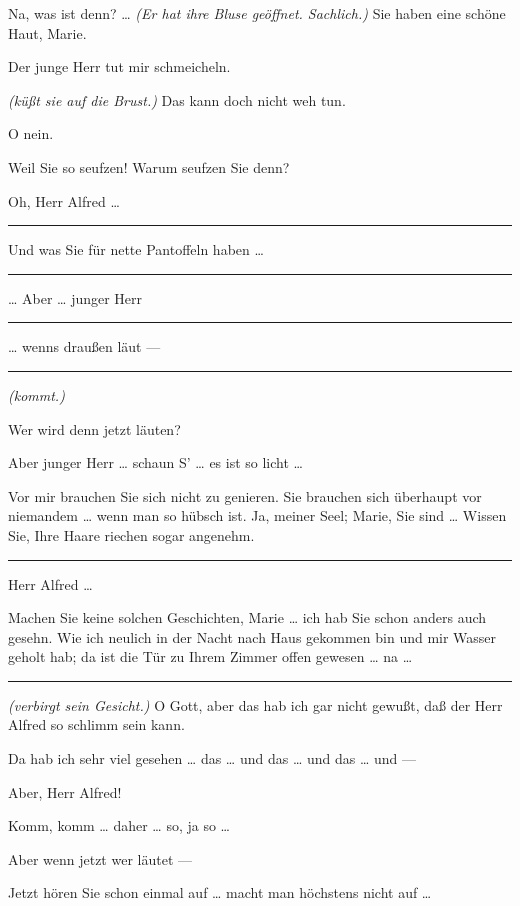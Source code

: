 \documentclass[
	final,
	a4paper,
	ngerman,
	mpinclude = true, %
	twoside = true,
	open = right,
	cleardoublepage = plain,
	DIV = 13,
	BCOR = 1cm,
	titlepage = firstiscover,
	]{scrbook}
\newcommand{\direction}[1]{\textit{(#1)}}
\newenvironment{deletion}{%
		\vspace{0.25\baselineskip}
		\hrule
		\vspace{0.25\baselineskip}
		\color{darkgray}
	}{
		\color{black}
		\vspace{0.25\baselineskip}
		\hrule 
		\vspace{0.25\baselineskip}
	}
\newcommand{\thecharacter}[1]{\textup{\textsc{#1}}\xspace}
\newcommand{\thepraktikant}{\thecharacter{Timo}}
\newcommand{\theherr}{\thecharacter{Benjamin}}
\newcommand{\character}[1]{\item[#1:]}
\newcommand{\praktikant}{\character{\thepraktikant}}
\newcommand{\herr}{\character{\theherr}}
\begin{document}
\begin{play}
	\herr
	Na, was ist denn? \ldots{} \direction{Er hat ihre Bluse geöffnet. Sachlich.} Sie haben eine schöne Haut, Marie.

	\praktikant
	Der junge Herr tut mir schmeicheln.

	\herr
	\direction{küßt sie auf die Brust.} Das kann doch nicht weh tun.

	\praktikant
	O nein.

	\herr
	Weil Sie so seufzen! Warum seufzen Sie denn?

	\praktikant
	Oh, Herr Alfred \ldots{}

	\begin{deletion}
	\herr
	Und was Sie für nette Pantoffeln haben \ldots{}
	\end{deletion}

	\praktikant
	\ldots{} Aber \ldots{} junger Herr 
	\begin{deletion}
		\ldots{} wenns draußen läut ---
	\end{deletion}
	\direction{kommt.}

	\herr
	Wer wird denn jetzt läuten?

	\praktikant
	Aber junger Herr \ldots{} schaun S' \ldots{} es ist so licht \ldots{}

	\herr
	Vor mir brauchen Sie sich nicht zu genieren. Sie brauchen sich überhaupt vor niemandem \ldots{} wenn man so hübsch ist. Ja, meiner Seel; Marie, Sie sind \ldots{} Wissen Sie, Ihre Haare riechen sogar angenehm.

	\begin{deletion}
	\praktikant
	Herr Alfred \ldots{}

	\herr
	Machen Sie keine solchen Geschichten, Marie \ldots{} ich hab Sie schon anders auch gesehn. Wie ich neulich in der Nacht nach Haus gekommen bin und mir Wasser geholt hab; da ist die Tür zu Ihrem Zimmer offen gewesen \ldots{} na \ldots{}
	\end{deletion}

	\praktikant
	\direction{verbirgt sein Gesicht.} O Gott, aber das hab ich gar nicht gewußt, daß der Herr Alfred so schlimm sein kann.

	\herr
	Da hab ich sehr viel gesehen \ldots{} das \ldots{} und das \ldots{} und das \ldots{} und ---

	\praktikant
	Aber, Herr Alfred!

	\herr
	Komm, komm \ldots{} daher \ldots{} so, ja so \ldots{}

	\praktikant
	Aber wenn jetzt wer läutet ---

	\herr
	Jetzt hören Sie schon einmal auf \ldots{} macht man höchstens nicht auf \ldots{}


\end{play}
\end{document}
